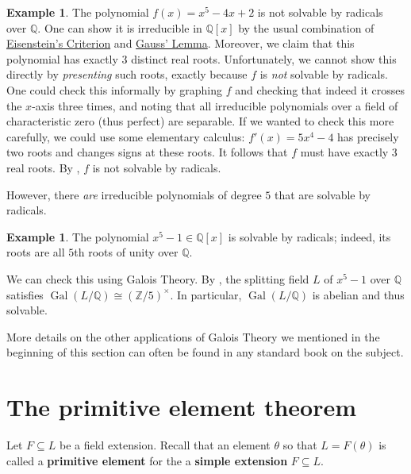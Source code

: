 \documentclass[12pt]{report}
\numberwithin{equation}{section}
\numberwithin{theorem}{chapter}
\theoremstyle{definition}
\newtheorem{example}[theorem]{Example}
\newtheorem*{basic properties}{Basic Properties}
\newtheorem*{Important Remark}{Important Remark}
\newcommand{\df}[1]{{\bf #1}\index{#1}}
\DeclareMathOperator{\Gal}{Gal}
\newcommand{\Z}{\mathbb{Z}}
\newcommand{\Q}{\mathbb{Q}}
\begin{document}
\begin{example} 
The polynomial $f(x) = x^5 - 4x + 2$ is not solvable by radicals over $\Q$.
One can show it is irreducible in $\Q[x]$ by the usual combination of \hyperref[eisenstein criterion]{Eisenstein's Criterion} and \hyperref[Gauss Lemma]{Gauss' Lemma}. Moreover, we claim that this polynomial has exactly $3$ distinct real roots. Unfortunately, we cannot show this directly by \emph{presenting} such roots, exactly because $f$ is \emph{not} solvable by radicals. One could check this informally by graphing $f$ and checking that indeed it crosses the $x$-axis three times, and noting that all irreducible polynomials over a field of characteristic zero (thus perfect) are separable. If we wanted to check this more carefully, we could use some elementary calculus: $f'(x) = 5x^4 - 4$ has precisely two roots and changes signs at these roots. It follows that $f$ must have exactly $3$ real roots. By , $f$ is not solvable by radicals.
\end{example}

However, there \emph{are} irreducible polynomials of degree $5$ that are solvable by radicals.

\begin{example}
	The polynomial $x^5-1 \in \Q[x]$ is solvable by radicals; indeed, its roots are all $5$th roots of unity over $\Q$.	
	
	We can check this using Galois Theory. By , the splitting field $L$ of $x^5-1$ over $\Q$ satisfies $\Gal(L/\Q) \cong (\Z/5)^\times$. In particular, $\Gal(L/\Q)$ is abelian and thus solvable.
\end{example}


More details on the other applications of Galois Theory we mentioned in the beginning of this section can often be found in any standard book on the subject.




\section{The primitive element theorem}


Let $F \subseteq L$ be a field extension. Recall that an element $\theta$ so that $L=F(\theta)$ is called a \df{primitive element} for the a \df{simple extension} $F \subseteq L$.
\end{document}
